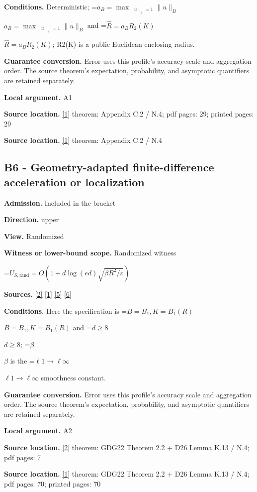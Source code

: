 \documentclass[10pt,a4paper]{article}
\newcommand{\AtlasMath}[1]{\par\begingroup\centering\setbox0=\hbox{$\displaystyle #1$}\ifdim\wd0>1.4\linewidth\typeout{ATLAS WIDE FORMULA: \the\wd0}\fi\ifdim\wd0>\linewidth\resizebox{\linewidth}{!}{\box0}\else\box0\fi\par\endgroup}
\newcommand{\AtlasInlineMath}[1]{\begingroup\setbox0=\hbox{$#1$}\ifdim\wd0>.4\linewidth\endgroup\AtlasMath{#1}\else\endgroup$#1$\fi}
\begin{document}
\textbf{Conditions.} Deterministic; \AtlasInlineMath{a_B=\max_{\|u\|_2=1}\|u\|_B} and \AtlasInlineMath{\widehat{R}=a_BR_2(K)}; R2(K) is a public Euclidean enclosing radius.

\textbf{Guarantee conversion.} Error uses this profile's accuracy scale and aggregation order. The source theorem's expectation, probability, and asymptotic quantifiers are retained separately.

\textbf{Local argument.} A1

\textbf{Source location.} \href{https://arxiv.org/html/2610.00345v1}{[1]} theorem: Appendix C.2 / N.4; pdf pages: 29; printed pages: 29

\textbf{Source location.} \href{https://arxiv.org/html/2610.00345v1}{[1]} theorem: Appendix C.2 / N.4

\subsection{B6 - Geometry-adapted finite-difference acceleration or localization}
\textbf{Admission.} Included in the bracket

\textbf{Direction.} upper

\textbf{View.} Randomized

\textbf{Witness or lower-bound scope.} Randomized witness

\AtlasMath{U_{S,\mathrm{rand}}=O(1+d\log(ed)\sqrt{\beta R^2/\varepsilon})}
\textbf{Sources.} \href{https://arxiv.org/abs/1802.09022}{[2]} \href{https://arxiv.org/html/2610.00345v1}{[1]} \href{https://proceedings.neurips.cc/paper_files/paper/2022/file/329ef22fd8cb68223d5df09a037f7dd9-Paper-Conference.pdf}{[5]} \href{https://jmlr.org/papers/volume18/16-632/16-632.pdf}{[6]}

\textbf{Conditions.} Here the specification is \AtlasInlineMath{B=B_1,K=B_1(R)} and \AtlasInlineMath{d\ge8}; \AtlasInlineMath{\beta} is the \AtlasInlineMath{\ell 1\to \ell \infty} smoothness constant.

\textbf{Guarantee conversion.} Error uses this profile's accuracy scale and aggregation order. The source theorem's expectation, probability, and asymptotic quantifiers are retained separately.

\textbf{Local argument.} A2

\textbf{Source location.} \href{https://arxiv.org/abs/1802.09022}{[2]} theorem: GDG22 Theorem 2.2 + D26 Lemma K.13 / N.4; pdf pages: 7

\textbf{Source location.} \href{https://arxiv.org/html/2610.00345v1}{[1]} theorem: GDG22 Theorem 2.2 + D26 Lemma K.13 / N.4; pdf pages: 70; printed pages: 70
\end{document}
